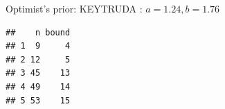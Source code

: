 \begin{frame}[fragile]{Optimist's prior: KEYTRUDA : \(a=1.24, b=1.76\)}
\begin{verbatim}
##    n bound
## 1  9     4
## 2 12     5
## 3 45    13
## 4 49    14
## 5 53    15
\end{verbatim}

\begin{Shaded}
\begin{Highlighting}[]
\NormalTok{(} \NormalTok{, } \NormalTok{, }  \NormalTok{, } \NormalTok{, } \NormalTok{)}
\NormalTok{(} \NormalTok{, } \NormalTok{, }  \NormalTok{, } \NormalTok{, } \NormalTok{)}
\end{Highlighting}
\end{Shaded}

\end{frame}


